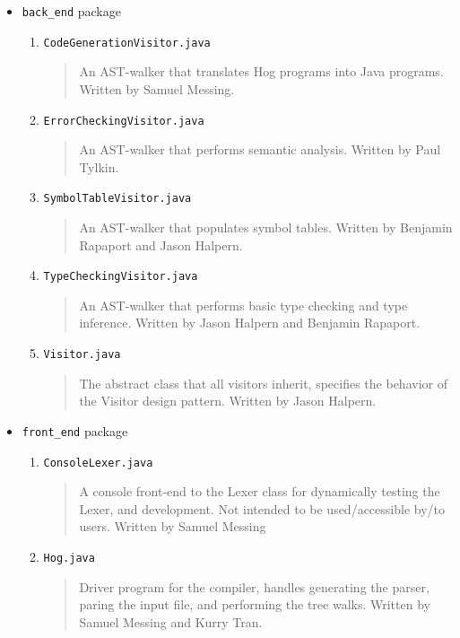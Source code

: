 \documentclass{book}
\begin{document}
\begin{itemize}
\item \texttt{back\_end} package
\begin{enumerate}
\item \texttt{CodeGenerationVisitor.java}
\begin{quotation}
\noindent An AST-walker that translates Hog programs into Java programs. Written by Samuel Messing.
\end{quotation}
\item \texttt{ErrorCheckingVisitor.java}
\begin{quotation}
\noindent An AST-walker that performs semantic analysis. Written by Paul Tylkin.
\end{quotation}
\item \texttt{SymbolTableVisitor.java}
\begin{quotation}
\noindent An AST-walker that populates symbol tables. Written by Benjamin Rapaport and Jason Halpern.
\end{quotation}
\item \texttt{TypeCheckingVisitor.java}
\begin{quotation}
\noindent An AST-walker that performs basic type checking and type inference. Written by Jason Halpern and Benjamin Rapaport. 
\end{quotation}
\item \texttt{Visitor.java}
\begin{quotation}
\noindent The abstract class that all visitors inherit, specifies the behavior of the Visitor design pattern. Written by Jason Halpern.
\end{quotation}
\end{enumerate} %
\item \texttt{front\_end} package
\begin{enumerate}
\item \texttt{ConsoleLexer.java}
\begin{quotation}
\noindent A console front-end to the Lexer class for dynamically testing the Lexer,
 and development. Not intended to be used/accessible by/to users. Written by Samuel Messing
\end{quotation}
\item \texttt{Hog.java}
\begin{quotation}
\noindent Driver program for the compiler, handles generating the parser, paring the input file, and performing the tree walks. Written by Samuel Messing and Kurry Tran. 
\end{quotation}

\end{enumerate}
\end{itemize}
\end{document}
